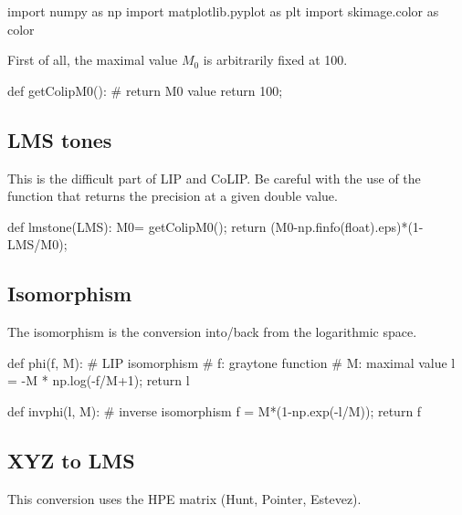 \def\QRCODE{MASTER_mispa_TUT.IMG.colip_pythonqrcode.png}
\def\QRPAGE{http://www.iptutorials.science/tree/master/MASTER_mispa/TUT.IMG.colip/python}


\begin{python}
import numpy as np
import matplotlib.pyplot as plt
import skimage.color as color
\end{python}


First of all, the maximal value $M_0$ is arbitrarily fixed at 100.

\begin{python}
def getColipM0():
    # return M0 value
    return 100;
\end{python}

\vspace*{-.3\baselineskip}

\subsection{LMS tones}
This is the difficult part of LIP and CoLIP. Be careful with the use of the function  that returns the precision at a given double value.
\begin{python}
def lmstone(LMS):
    M0= getColipM0();
    return (M0-np.finfo(float).eps)*(1-LMS/M0);
\end{python}

\vspace*{-.3\baselineskip}

\subsection{Isomorphism}
The isomorphism is the conversion into/back from the logarithmic space.

\begin{python}
def phi(f, M):
    # LIP isomorphism
    # f: graytone function
    # M: maximal value
    l = -M * np.log(-f/M+1);
    return l
\end{python}

\begin{python}
def invphi(l, M):
    # inverse isomorphism
    f = M*(1-np.exp(-l/M));
    return f
\end{python}

\vspace*{-.3\baselineskip}

\subsection{XYZ to LMS}
This conversion uses the HPE matrix (Hunt, Pointer, Estevez).

